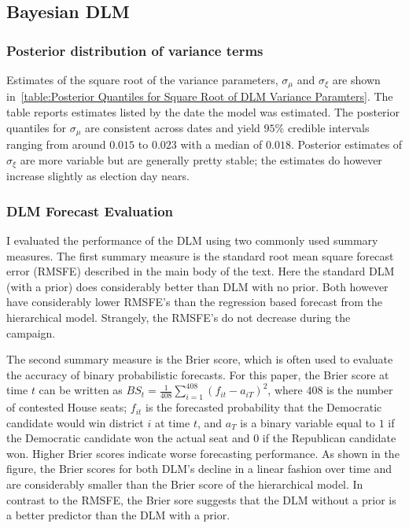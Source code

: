 \documentclass[12pt,final,fleqn]{article}
\theoremstyle{plain}
\begin{document}
\subsection{Bayesian DLM}
\subsubsection{Posterior distribution of variance terms}
Estimates of the square root of the variance parameters, $\sigma_\mu$ and $\sigma_\xi$ are shown in~\autoref{table:Posterior Quantiles for Square Root of DLM Variance Paramters}. The table reports estimates listed by the date the model was estimated. The posterior quantiles for $\sigma_\mu$ are consistent across dates and yield $95\%$ credible intervals ranging from around $0.015$ to  $0.023$ with a median of $0.018$. Posterior estimates of $\sigma_\xi$ are more variable but are generally pretty stable; the estimates do however increase slightly as election day nears.

\subsubsection{DLM Forecast Evaluation}
I evaluated the performance of the DLM using two commonly used summary measures. The first summary measure is the standard root mean square forecast error (RMSFE) described in the main body of the text. Here the standard DLM (with a prior) does considerably better than DLM with no prior. Both however have considerably lower RMSFE's than the regression based forecast from the hierarchical model. Strangely, the RMSFE's do not decrease during the campaign.

The second summary measure is the Brier score, which is often used to evaluate the accuracy of binary probabilistic forecasts. For this paper, the Brier score at time $t$ can be written as $BS_t = \frac{1}{408} \sum_{i=1}^{408}(f_{it} - a_{iT})^2$, where $408$ is the number of contested House seats; $f_{it}$ is the forecasted probability that the Democratic candidate would win district $i$ at time $t$, and $a_T$ is a binary variable equal to $1$ if the Democratic candidate won the actual seat and $0$ if the Republican candidate won. Higher Brier scores indicate worse forecasting performance. As shown in the figure, the Brier scores for both DLM's decline in a linear fashion over time and are considerably smaller than the Brier score of the hierarchical model. In contrast to the RMSFE, the Brier sore suggests that the DLM without a prior is a better predictor than the DLM with a prior. 
\end{document}
